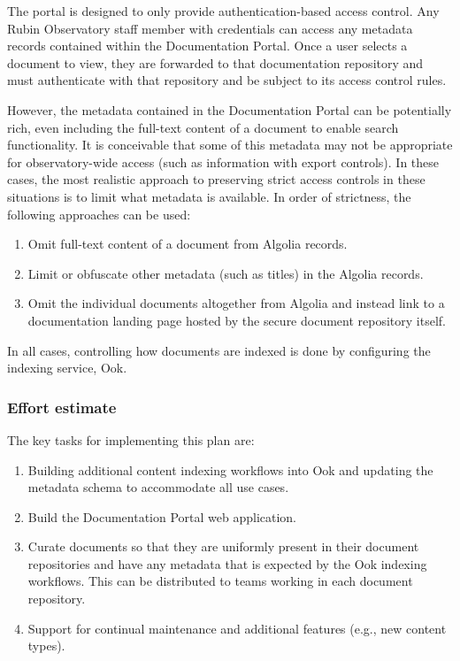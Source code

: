 The portal is designed to only provide authentication-based access control.
Any Rubin Observatory staff member with credentials can access any metadata records contained within the Documentation Portal.
Once a user selects a document to view, they are forwarded to that documentation repository and must authenticate with that repository and be subject to its access control rules.

However, the metadata contained in the Documentation Portal can be potentially rich, even including the full-text content of a document to enable search functionality.
It is conceivable that some of this metadata may not be appropriate for observatory-wide access (such as information with export controls).
In these cases, the most realistic approach to preserving strict access controls in these situations is to limit what metadata is available.
In order of strictness, the following approaches can be used:

\begin{enumerate}
  \item Omit full-text content of a document from Algolia records.
  \item Limit or obfuscate other metadata (such as titles) in the Algolia records.
  \item Omit the individual documents altogether from Algolia and instead link to a documentation landing page hosted by the secure document repository itself.
\end{enumerate}

In all cases, controlling how documents are indexed is done by configuring the indexing service, Ook.

\subsubsection{Effort estimate}

The key tasks for implementing this plan are:

\begin{enumerate}
  \item Building additional content indexing workflows into Ook and updating the metadata schema to accommodate all use cases.
  \item Build the Documentation Portal web application.
  \item Curate documents so that they are uniformly present in their document repositories and have any metadata that is expected by the Ook indexing workflows.
  This can be distributed to teams working in each document repository.
  \item Support for continual maintenance and additional features (e.g., new content types).
\end{enumerate}


